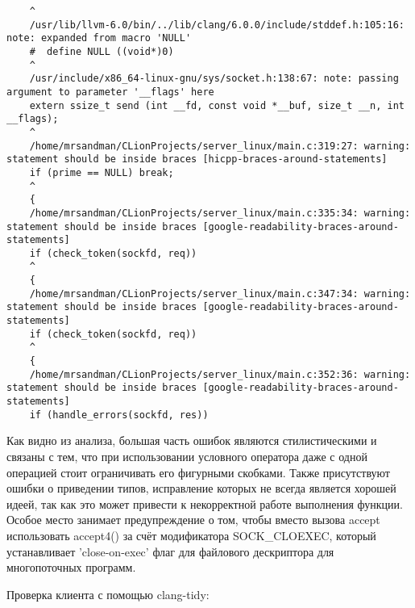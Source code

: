 \begin{itemize}
\begin{lstlisting}
	^
	/usr/lib/llvm-6.0/bin/../lib/clang/6.0.0/include/stddef.h:105:16: note: expanded from macro 'NULL'
	#  define NULL ((void*)0)
	^
	/usr/include/x86_64-linux-gnu/sys/socket.h:138:67: note: passing argument to parameter '__flags' here
	extern ssize_t send (int __fd, const void *__buf, size_t __n, int __flags);
	^
	/home/mrsandman/CLionProjects/server_linux/main.c:319:27: warning: statement should be inside braces [hicpp-braces-around-statements]
	if (prime == NULL) break;
	^
	{
	/home/mrsandman/CLionProjects/server_linux/main.c:335:34: warning: statement should be inside braces [google-readability-braces-around-statements]
	if (check_token(sockfd, req))
	^
	{
	/home/mrsandman/CLionProjects/server_linux/main.c:347:34: warning: statement should be inside braces [google-readability-braces-around-statements]
	if (check_token(sockfd, req))
	^
	{
	/home/mrsandman/CLionProjects/server_linux/main.c:352:36: warning: statement should be inside braces [google-readability-braces-around-statements]
	if (handle_errors(sockfd, res))
\end{lstlisting}

Как видно из анализа, большая часть ошибок являются стилистическими и связаны с тем, что при использовании условного оператора даже с одной операцией стоит ограничивать его фигурными скобками. Также присутствуют ошибки о приведении типов, исправление которых не всегда является хорошей идеей, так как это может привести к некорректной работе выполнения функции. Особое место занимает предупреждение о том, чтобы вместо вызова accept использовать accept4() за счёт модификатора SOCK\_CLOEXEC, который устанавливает 'close-on-exec' флаг для файлового дескриптора для многопоточных программ.

Проверка клиента с помощью clang-tidy:


\end{itemize}
